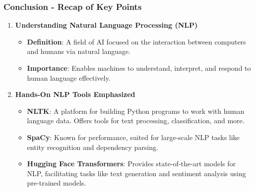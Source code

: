 \documentclass[aspectratio=169]{beamer}
\begin{document}
\begin{frame}[fragile]
    \frametitle{Conclusion - Recap of Key Points}
    \begin{enumerate}
        \item \textbf{Understanding Natural Language Processing (NLP)}
        \begin{itemize}
            \item \textbf{Definition}: A field of AI focused on the interaction between computers and humans via natural language.
            \item \textbf{Importance}: Enables machines to understand, interpret, and respond to human language effectively.
        \end{itemize}

        \item \textbf{Hands-On NLP Tools Emphasized}
        \begin{itemize}
            \item \textbf{NLTK}: A platform for building Python programs to work with human language data. Offers tools for text processing, classification, and more.
            \item \textbf{SpaCy}: Known for performance, suited for large-scale NLP tasks like entity recognition and dependency parsing.
            \item \textbf{Hugging Face Transformers}: Provides state-of-the-art models for NLP, facilitating tasks like text generation and sentiment analysis using pre-trained models.
        \end{itemize}
    \end{enumerate}
\end{frame}
\end{document}
